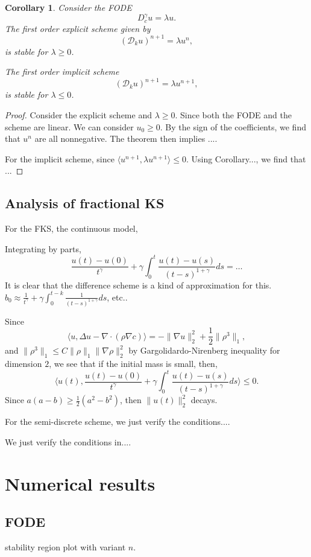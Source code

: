 \documentclass[11pt]{article} %
\newtheorem{cor}{Corollary}
\begin{document}
\begin{cor}
Consider the FODE $$
D_c^{\gamma}u=\lambda u.
$$
The first order explicit scheme given by $$
(\mathscr{D}_ku)^{n+1}=\lambda u^n,
$$
is stable for $\lambda\ge 0$.

The first order implicit scheme 
$$
(\mathscr{D}_ku)^{n+1}=\lambda u^{n+1},
$$
is stable for $\lambda\le 0$.
\end{cor}
\begin{proof}
Consider the explicit scheme and $\lambda\ge 0$. Since both the FODE and the scheme are linear. We can consider $u_0\ge 0$.
By the sign of the coefficients, we find that $u^n$ are all nonnegative.
The theorem then implies ....

For the implicit scheme, since $\langle u^{n+1}, \lambda u^{n+1}\rangle\le 0$. Using Corollary..., we find that ...
\end{proof}

\subsection{Analysis of fractional KS}

For the FKS, the continuous model,

Integrating by parts, $$
\frac{u(t)-u(0)}{t^{\gamma}}+\gamma\int_0^t\frac{u(t)-u(s)}{(t-s)^{1+\gamma}}ds
=\ldots
$$
It is clear that the difference scheme is a kind of approximation for this.
$b_0\approx \frac{1}{t^{\gamma}}+\gamma\int_0^{t-k}\frac{1}{(t-s)^{1+\gamma}}ds$, etc..

Since $$
\langle u, \Delta u-\nabla\cdot(\rho\nabla c)\rangle
=-\|\nabla u\|_2^2+\frac{1}{2}\|\rho^3\|_1,
$$
and $\|\rho^3\|_1\le C\|\rho\|_1\|\nabla\rho\|_2^2$ by Gargolidardo-Nirenberg inequality for dimension $2$, we see that if the initial mass is small, then, 
 $$
\langle u(t), \frac{u(t)-u(0)}{t^{\gamma}}+\gamma\int_0^t\frac{u(t)-u(s)}{(t-s)^{1+\gamma}}ds\rangle\le 0. 
$$
Since $a(a-b)\ge \frac{1}{2}(a^2-b^2)$, then $\|u(t)\|_2^2$ decays.


For the semi-discrete scheme, we just verify the conditions....



We just verify the conditions in....

\section{Numerical results}
\subsection{FODE}
stability region plot with variant $n$. \\
\end{document}
